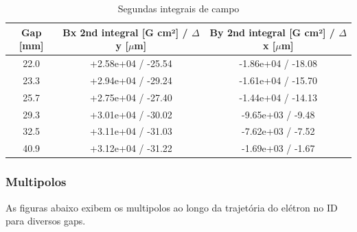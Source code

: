 \documentclass[a4paper,12pt]{article}
\begin{document}
\begin{table}[H]
\centering
\caption{Segundas integrais de campo}
\begin{tabular}{|c|c|c|}
\hline
   Gap [mm] & Bx 2nd integral [G cm²] / $\Delta$ y [$\mu$m] & By 2nd integral [G cm²] / $\Delta$ x [$\mu$m]   \\
\hline
    22.0 & +2.58e+04 / -25.54 & -1.86e+04 / -18.08 \\
    23.3 & +2.94e+04 / -29.24 & -1.61e+04 / -15.70 \\
    25.7 & +2.75e+04 / -27.40 & -1.44e+04 / -14.13 \\
    29.3 & +3.01e+04 / -30.02 & -9.65e+03 / -9.48 \\
    32.5 & +3.11e+04 / -31.03 & -7.62e+03 / -7.52 \\
    40.9 & +3.12e+04 / -31.22 & -1.69e+03 / -1.67 \\
\hline
\end{tabular}
\end{table}

\subsubsection{Multipolos}
As figuras abaixo exibem os multipolos ao longo da trajetória do elétron no ID para diversos gaps.
\end{document}
